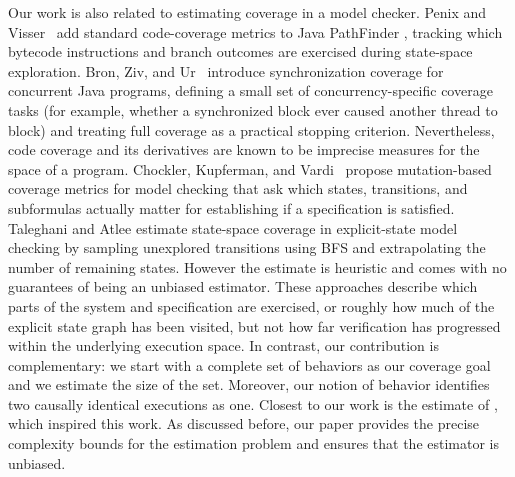 Our work is also related to estimating coverage in a model checker.
Penix and Visser~\cite{penix} add standard code-coverage metrics to Java PathFinder \cite{jpf}, tracking which bytecode instructions and branch outcomes are exercised during state-space exploration.
Bron, Ziv, and Ur~\cite{bron05} introduce synchronization coverage for concurrent Java programs, defining a small set of concurrency-specific coverage tasks (for example, whether a synchronized block ever caused another thread to block) and treating full coverage as a practical stopping criterion.
Nevertheless, code coverage and its derivatives are known to be imprecise measures for the space of a program.
Chockler, Kupferman, and Vardi~\cite{10.1007/978-3-540-39724-3_11} propose mutation-based coverage metrics for model checking that ask which states, transitions, and subformulas actually matter for establishing
if a specification is satisfied.  
Taleghani and Atlee \cite{5431751} estimate state-space coverage in explicit-state model checking by sampling unexplored transitions using BFS and extrapolating the number of remaining states. 
However the estimate is heuristic and comes with no guarantees of being an unbiased estimator. 
These approaches describe which parts of the system and specification are exercised, or roughly how much of the explicit state graph has been visited, but not how far verification has progressed within the underlying execution space. 
In contrast, our contribution is complementary: we start with a complete set of behaviors as our coverage goal and we estimate the size of the set.
Moreover, our notion of behavior identifies two causally identical executions as one.
Closest to our work is the estimate of \cite{gator}, which inspired this work.
As discussed before, our paper provides the precise complexity bounds for the estimation problem and ensures that the estimator is unbiased.

